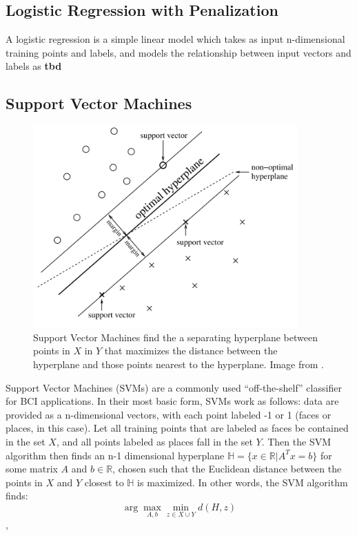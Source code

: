 \documentclass[12pt]{report}
\newcommand{\argmax}{\arg\!\max}
\begin{document}
\subsection{Logistic Regression with Penalization}

A logistic regression is a simple linear model which takes as input n-dimensional training points and labels, and models the relationship between input vectors and labels as {\bf tbd}

\subsection{Support Vector Machines}

\begin{figure}[t]
\centering
\includegraphics[width=4in]{svm}
\caption{Support Vector Machines find the a separating hyperplane between points in $X$ in $Y$ that maximizes the distance between the hyperplane and those points nearest to the hyperplane. Image from \cite{Lotte}.}
\end{figure}

	Support Vector Machines (SVMs) are a commonly used ``off-the-shelf'' classifier for BCI applications.  In their most basic form, SVMs work as follows:  data are provided as a n-dimensional vectors, with each point labeled -1 or 1 (faces or places, in this case).  Let all training points that are labeled as faces be contained in the set $X$, and all points labeled as places fall in the set $Y$.  Then the SVM algorithm then finds an n-1 dimensional hyperplane $\mathbb{H} = \{x\in \mathbb{R}| A^Tx=b\}$ for some matrix $A$ and $b\in \mathbb{R}$, chosen such that the Euclidean distance between the points in $X$ and $Y$ closest to $\mathbb{H}$ is maximized.  In other words, the SVM algorithm finds:
		$$ \argmax_{A,b} \min_{z\in X\cup Y} d(H,z) $$,
		
\end{document}
